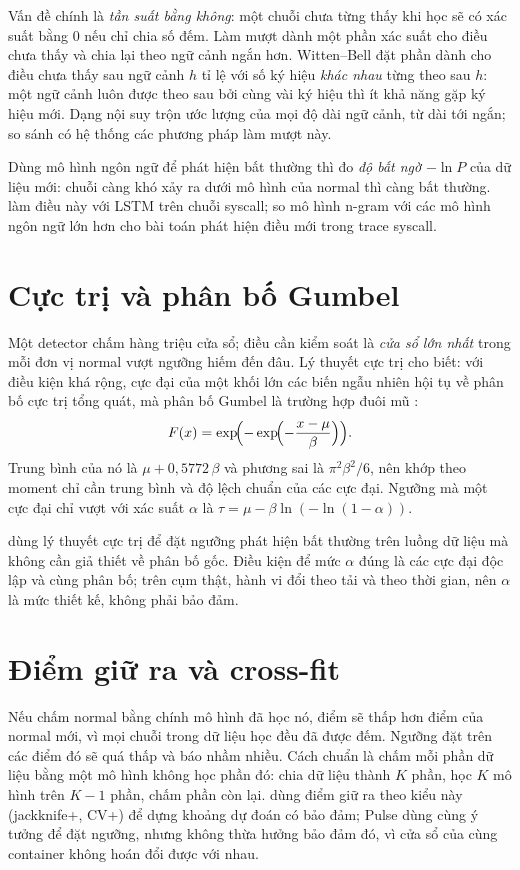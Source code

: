 Vấn đề chính là \emph{tần suất bằng không}: một chuỗi chưa từng thấy khi học sẽ có xác suất bằng 0 nếu chỉ chia số đếm. Làm mượt dành một phần xác suất cho điều chưa thấy và chia lại theo ngữ cảnh ngắn hơn. Witten--Bell \citep{witten1991} đặt phần dành cho điều chưa thấy sau ngữ cảnh $h$ tỉ lệ với số ký hiệu \emph{khác nhau} từng theo sau $h$: một ngữ cảnh luôn được theo sau bởi cùng vài ký hiệu thì ít khả năng gặp ký hiệu mới. Dạng nội suy trộn ước lượng của mọi độ dài ngữ cảnh, từ dài tới ngắn; \citet{chen1999} so sánh có hệ thống các phương pháp làm mượt này.

Dùng mô hình ngôn ngữ để phát hiện bất thường thì đo \emph{độ bất ngờ} $-\ln P$ của dữ liệu mới: chuỗi càng khó xảy ra dưới mô hình của normal thì càng bất thường. \citet{kim2016} làm điều này với LSTM trên chuỗi syscall; \citet{fournier2023} so mô hình n-gram với các mô hình ngôn ngữ lớn hơn cho bài toán phát hiện điều mới trong trace syscall.

\section{Cực trị và phân bố Gumbel}

Một detector chấm hàng triệu cửa sổ; điều cần kiểm soát là \emph{cửa sổ lớn nhất} trong mỗi đơn vị normal vượt ngưỡng hiếm đến đâu. Lý thuyết cực trị cho biết: với điều kiện khá rộng, cực đại của một khối lớn các biến ngẫu nhiên hội tụ về phân bố cực trị tổng quát, mà phân bố Gumbel là trường hợp đuôi mũ \citep{coles2001}:
\[
F(x) = \exp\!\Bigl(-\exp\!\Bigl(-\frac{x - \mu}{\beta}\Bigr)\Bigr).
\]
Trung bình của nó là $\mu + 0{,}5772\,\beta$ và phương sai là $\pi^2 \beta^2 / 6$, nên khớp theo moment chỉ cần trung bình và độ lệch chuẩn của các cực đại. Ngưỡng mà một cực đại chỉ vượt với xác suất $\alpha$ là $\tau = \mu - \beta \ln(-\ln(1 - \alpha))$.

\citet{siffer2017} dùng lý thuyết cực trị để đặt ngưỡng phát hiện bất thường trên luồng dữ liệu mà không cần giả thiết về phân bố gốc. Điều kiện để mức $\alpha$ đúng là các cực đại độc lập và cùng phân bố; trên cụm thật, hành vi đổi theo tải và theo thời gian, nên $\alpha$ là mức thiết kế, không phải bảo đảm.

\section{Điểm giữ ra và cross-fit}

Nếu chấm normal bằng chính mô hình đã học nó, điểm sẽ thấp hơn điểm của normal mới, vì mọi chuỗi trong dữ liệu học đều đã được đếm. Ngưỡng đặt trên các điểm đó sẽ quá thấp và báo nhầm nhiều. Cách chuẩn là chấm mỗi phần dữ liệu bằng một mô hình không học phần đó: chia dữ liệu thành $K$ phần, học $K$ mô hình trên $K-1$ phần, chấm phần còn lại. \citet{barber2021} dùng điểm giữ ra theo kiểu này (jackknife+, CV+) để dựng khoảng dự đoán có bảo đảm; Pulse dùng cùng ý tưởng để đặt ngưỡng, nhưng không thừa hưởng bảo đảm đó, vì cửa sổ của cùng container không hoán đổi được với nhau.

